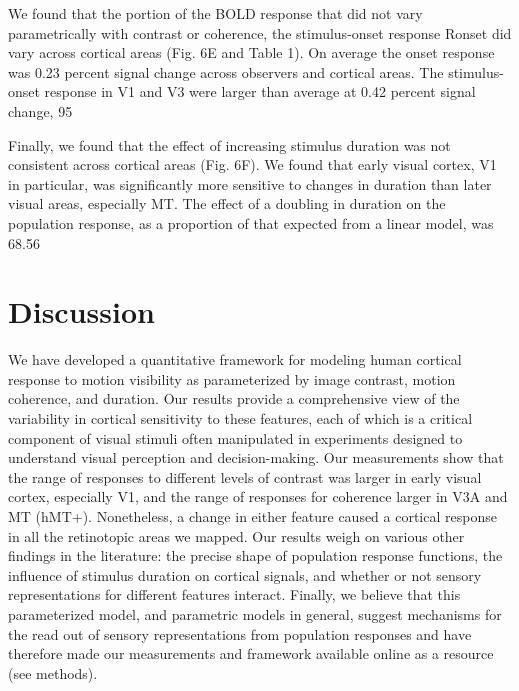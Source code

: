 \documentclass{report}
\begin{document}
We found that the portion of the BOLD response that did not vary parametrically with contrast or coherence, the stimulus-onset response Ronset did vary across cortical areas (Fig. 6E and Table 1). On average the onset response was 0.23 percent signal change across observers and cortical areas. The stimulus-onset response in V1 and V3 were larger than average at 0.42 percent signal change, 95%

Finally, we found that the effect of increasing stimulus duration was not consistent across cortical areas (Fig. 6F). We found that early visual cortex, V1 in particular, was significantly more sensitive to changes in duration than later visual areas, especially MT. The effect of a doubling in duration on the population response, as a proportion of that expected from a linear model, was 68.56%
\section{Discussion}
We have developed a quantitative framework for modeling human cortical response to motion visibility as parameterized by image contrast, motion coherence, and duration. Our results provide a comprehensive view of the variability in cortical sensitivity to these features, each of which is a critical component of visual stimuli often manipulated in experiments designed to understand visual perception and decision-making. Our measurements show that the range of responses to different levels of contrast was larger in early visual cortex, especially V1, and the range of responses for coherence larger in V3A and MT (hMT+). Nonetheless, a change in either feature caused a cortical response in all the retinotopic areas we mapped. Our results weigh on various other findings in the literature: the precise shape of population response functions, the influence of stimulus duration on cortical signals, and whether or not sensory representations for different features interact. Finally, we believe that this parameterized model, and parametric models in general, suggest mechanisms for the read out of sensory representations from population responses and have therefore made our measurements and framework available online as a resource (see methods).
\end{document}
